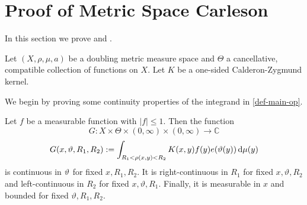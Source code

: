 \section{Proof of Metric Space Carleson}
\label{thmfromproplinear}

In this section we prove  and .

Let $(X, \rho, \mu, a)$ be a doubling metric measure space and $\Theta$ a cancellative, compatible collection of functions on $X$. Let $K$ be a one-sided Calderon-Zygmund kernel.

We begin by proving some continuity properties of the integrand in \eqref{def-main-op}.

\begin{lemma}
    \label{int-continuous}
    \leanok
    Let $f$ be a measurable function with $|f| \le 1$. Then the function
    \[
        G: X \times \Theta \times (0,\infty) \times (0, \infty) \to \mathbb{C}
    \]
    \[
        G(x, {\vartheta}, R_1, R_2) := \int_{R_1 < \rho(x,y) < R_2} K(x,y) f(y) e({\vartheta}(y)) \, \mathrm{d}\mu(y)
    \]
    is continuous in ${\vartheta}$ for fixed $x, R_1, R_2$. It is right-continuous in $R_1$ for fixed $x, \vartheta, R_2$ and left-continuous in $R_2$ for fixed $x, \vartheta, R_1$. Finally, it is measurable in $x$ and bounded for fixed $\vartheta, R_1, R_2$.
\end{lemma}

